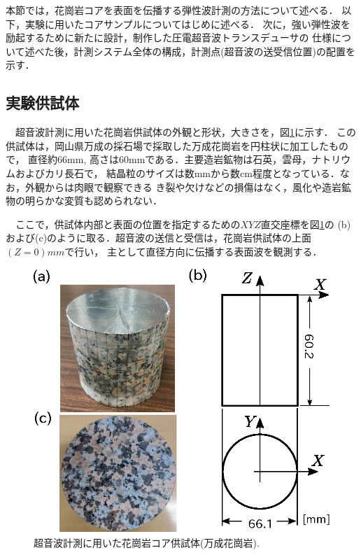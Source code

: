 ﻿本節では，花崗岩コアを表面を伝播する弾性波計測の方法について述べる．
以下，実験に用いたコアサンプルについてはじめに述べる．
次に，強い弾性波を励起するために新たに設計，制作した圧電超音波トランスデューサの
仕様について述べた後，計測システム全体の構成，計測点(超音波の送受信位置)の配置を示す．
\subsection{実験供試体}
　超音波計測に用いた花崗岩供試体の外観と形状，大きさを，図\ref{fig:fig1}に示す．
この供試体は，岡山県万成の採石場で採取した万成花崗岩を円柱状に加工したもので，
直径約66mm, 高さは60mmである．主要造岩鉱物は石英，雲母，ナトリウムおよびカリ長石で，
結晶粒のサイズは数mmから数cm程度となっている．なお，外観からは肉眼で観察できる
き裂や欠けなどの損傷はなく，風化や造岩鉱物の明らかな変質も認められない．

　ここで，供試体内部と表面の位置を指定するための$XYZ$直交座標を図\ref{fig:fig1}の
(b)および(c)のように取る．超音波の送信と受信は，花崗岩供試体の上面$(Z=0)mm$で行い，
主として直径方向に伝播する表面波を観測する．
\begin{figure}[h]
	\begin{center}
	\includegraphics[width=0.6\linewidth]{Figs/fig1.eps} 
	\end{center}
	\caption{
		超音波計測に用いた花崗岩コア供試体(万成花崗岩).
	} 
	\label{fig:fig1}
\end{figure}
